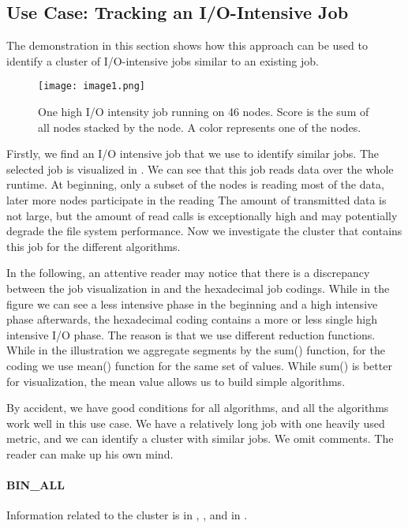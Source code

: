\documentclass{jhps}
\begin{document}
\subsection{Use Case: Tracking an I/O-Intensive Job}
The demonstration in this section shows how this approach can be used to identify a cluster of I/O-intensive jobs similar to an existing job.

\begin{figure}
  \centering
  \texttt{[image: image1.png]}
  \caption{One high I/O intensity job running on 46 nodes.
Score is the sum of all nodes stacked by the node.
A color represents one of the nodes.}
  \label{fig:use_case}
\end{figure}

Firstly, we find an I/O intensive job that we use to identify similar jobs.
The selected job is visualized in .
We can see that this job reads data over the whole runtime.
At beginning, only a subset of the nodes is reading most of the data, later more nodes participate in the reading The amount of transmitted data is not large, but the amount of read calls is exceptionally high and may potentially degrade the file system performance.
Now we investigate the cluster that contains this job for the different algorithms.

In the following, an attentive reader may notice that there is a discrepancy between the job visualization in   and the hexadecimal job codings.
While in the figure we can see a less intensive phase in the beginning and a high intensive phase afterwards, the hexadecimal coding contains a more or less single high intensive I/O phase.
The reason is that we use different reduction functions.
While in the illustration we aggregate segments by the sum() function, for the coding we use mean() function for the same set of values.
While sum() is better for visualization, the mean value allows us to build simple algorithms.

By accident, we have good conditions for all algorithms, and all the algorithms work well in this use case.
We have a relatively long job with one heavily used metric, and we can identify a cluster with similar jobs.
We omit comments.
The reader can make up his own mind.
\paragraph{BIN\_ALL}
Information related to the cluster is in , , and in .
\end{document}
